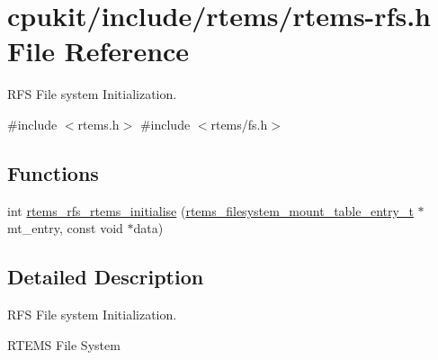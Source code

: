 \hypertarget{rtems-rfs_8h}{}\section{cpukit/include/rtems/rtems-\/rfs.h File Reference}
\label{rtems-rfs_8h}


R\+FS File system Initialization.  


{\ttfamily \#include $<$rtems.\+h$>$}\newline
{\ttfamily \#include $<$rtems/fs.\+h$>$}\newline
\subsection*{Functions}
\begin{DoxyCompactItemize}
\item 
int \mbox{\hyperlink{group__rtems__rfs_gaf07230e2a00d753c32235965ba8ca4ad}{rtems\+\_\+rfs\+\_\+rtems\+\_\+initialise}} (\mbox{\hyperlink{structrtems__filesystem__mount__table__entry__tt}{rtems\+\_\+filesystem\+\_\+mount\+\_\+table\+\_\+entry\+\_\+t}} $\ast$mt\+\_\+entry, const void $\ast$data)
\end{DoxyCompactItemize}


\subsection{Detailed Description}
R\+FS File system Initialization. 

R\+T\+E\+MS File System 
